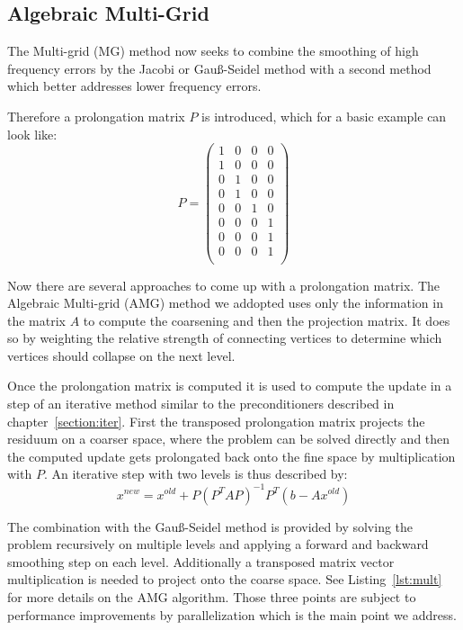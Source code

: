 \documentclass[a4paper,11pt]{scrartcl}
\begin{document}
\subsection{Algebraic Multi-Grid}
The Multi-grid (MG) method now seeks to combine the smoothing of high
frequency errors by the Jacobi or Gauß-Seidel method with a second method which
better addresses lower frequency errors.

Therefore a prolongation matrix $P$ is introduced, which for a basic example
can look like:
$$P =
\begin{pmatrix}
  1 & 0 & 0 & 0 \\
  1 & 0 & 0 & 0 \\
  0 & 1 & 0 & 0 \\
  0 & 1 & 0 & 0 \\
  0 & 0 & 1 & 0 \\
  0 & 0 & 0 & 1 \\
  0 & 0 & 0 & 1 \\
  0 & 0 & 0 & 1 \\
\end{pmatrix}
$$

Now there are several approaches to come up with a prolongation matrix.
The Algebraic Multi-grid (AMG) method we addopted uses only the information
in the matrix $A$ to compute the coarsening and then the projection matrix.
It does so by weighting the relative strength of connecting vertices to
determine which vertices should collapse on the next level.

Once the prolongation matrix is computed it is used to compute the update in a
step of an iterative method similar to the preconditioners described in
chapter~\ref{section:iter}.
First the transposed prolongation matrix projects the residuum on a
coarser space, where the problem can be solved directly and then the computed
update gets prolongated back onto the fine space by multiplication with $P$.
An iterative step with two levels is thus described by:
$$x^{new} = x^{old} + P (P^{T} A P)^{-1} P^{T} (b - A x^{old})$$

The combination with the Gauß-Seidel method is provided by solving the problem
recursively on multiple levels and applying a forward and backward smoothing
step on each level. Additionally a transposed matrix vector multiplication
is needed to project onto the coarse space.
See Listing~\ref{lst:mult} for more details on the AMG algorithm.
Those three points are subject to performance improvements by parallelization
which is the main point we address.
\end{document}
